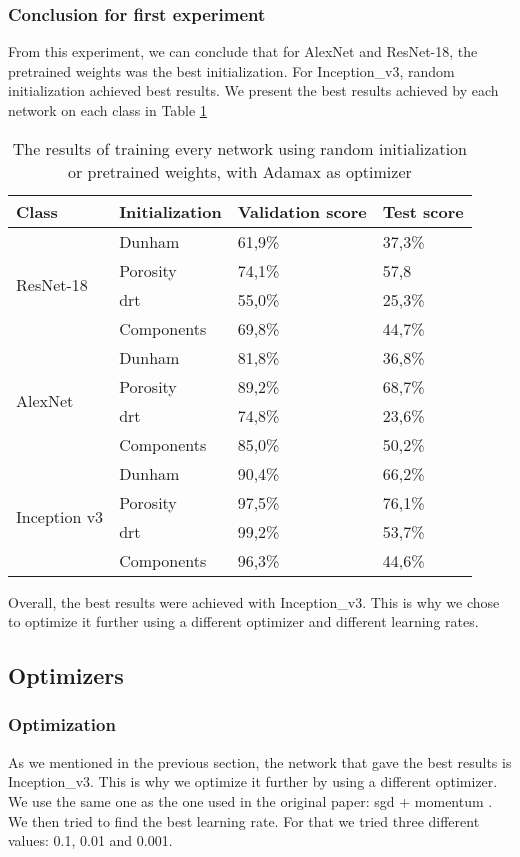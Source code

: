 \subsubsection{Conclusion for first experiment}
From this experiment, we can conclude that for AlexNet and ResNet-18, the pretrained weights was the best initialization. For Inception\_v3, random initialization achieved best results. We present the best results achieved by each network on each class in Table \ref{tab:finalinit}
\begin{table}
\caption[Best results for each network]{\label{tab:finalinit} The results of training every network using random initialization or pretrained weights, with Adamax as optimizer}
\centering
\begin{tabular}[b]{| l |  l | l | l |}
\hline
    Class & Initialization & Validation score  & Test score\\ \hline
    \multirow{4}{*}{ResNet-18} & Dunham &  61,9\%  & 37,3\% \\ 
    & Porosity & 74,1\% &  57,8\\
    &\gls{drt} & 55,0\% &  25,3\% \\
    &Components & 69,8\% &  44,7\% \\ \hline
     \multirow{4}{*}{AlexNet} & Dunham &  81,8\% & 36,8\% \\
    & Porosity & 89,2\% &  68,7\% \\
    &\gls{drt} & 74,8\% &   23,6\% \\
    &Components & 85,0\% & 50,2\% \\ \hline
    \multirow{4}{*}{Inception v3} & Dunham &  90,4\% & 66,2\% \\
    & Porosity & 97,5\% &  76,1\% \\
    &\gls{drt} & 99,2\% &  53,7\% \\
    &Components & 96,3\% & 44,6\% \\ \hline
\end{tabular} 
\end{table}

Overall, the best results were achieved with Inception\_v3. This is why we chose to optimize it further using a different optimizer and different learning rates. 


\subsection{Optimizers}
\subsubsection{Optimization}
As we mentioned in the previous section, the network that gave the best results is Inception\_v3.
This is why we optimize it further by using a different optimizer. We use the same one as the one used in the original paper: \gls{sgd} + momentum \cite{googlepaper}. We then tried to find the best learning rate. For that we tried three different values: 0.1, 0.01 and 0.001.

